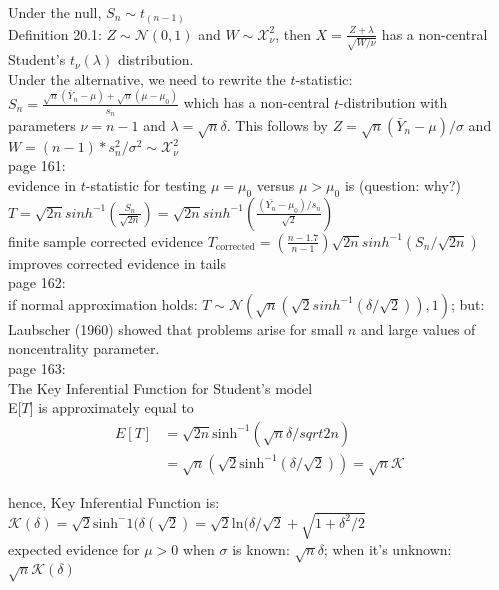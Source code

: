 Under the null, $S_n \sim t_(n-1)$\\

Definition 20.1: $Z\sim \mathcal{N}(0,1)$ and $W\sim \mathcal{X}_\nu^2$, then $X = \frac{Z+\lambda}{\sqrt{W/\nu}}$ has a non-central Student's $t_\nu(\lambda)$ distribution.\\

Under the alternative, we need to rewrite the $t$-statistic: $S_n = \frac{\sqrt{n}(\bar{Y}_n-\mu)+\sqrt{n}(\mu-\mu_0)}{s_n}$ which has a non-central $t$-distribution with parameters $\nu = n-1$ and $\lambda = \sqrt{n}\delta$. This follows by $Z = \sqrt{n}(\bar{Y}_n-\mu)/\sigma$ and $W=(n-1)*s_n^2/\sigma^2\sim \mathcal{X}_{\nu}^2$\\

page 161:\\
evidence in $t$-statistic for testing $\mu = \mu_0$ versus $\mu > \mu_0$ is (question: why?) $T = \sqrt{2n}sinh^{-1}(\frac{S_n}{\sqrt{2n}})=\sqrt{2n}sinh^{-1}(\frac{(\bar{Y_n}-\mu_0)/s_n}{\sqrt{2}})$\\
finite sample corrected evidence $T_{\text{corrected}}=(\frac{n-1.7}{n-1})\sqrt{2n}sinh^{-1}(S_n/\sqrt{2n})$ improves corrected evidence in tails\\

page 162:\\
if normal approximation holds: $T\sim \mathcal{N}(\sqrt{n}(\sqrt{2}sinh^{-1}(\delta/\sqrt{2})),1)$; but: Laubscher (1960) showed that problems arise for small $n$ and large values of noncentrality parameter.\\

page 163:\\
The Key Inferential Function for Student's model\\
E[$T$] is approximately equal to 
\begin{align*}
    E[T] &= \sqrt{2n}\text{sinh}^{-1}(\sqrt{n}\delta/sqrt{2n})\\
    &= \sqrt{n}(\sqrt{2}\text{sinh}^{-1}(\delta/\sqrt{2})) = \sqrt{n}\mathcal{K}
\end{align*}

hence, Key Inferential Function is: $\mathcal{K}(\delta)=\sqrt{2}\text{sinh}^-1(\delta(\sqrt{2})=\sqrt{2}\text{ln}(\delta/\sqrt{2}+\sqrt{1+\delta^2/2}$\\

expected evidence for $\mu > 0$ when $\sigma$ is known: $\sqrt{n}\delta$; when it's unknown: $\sqrt{n}\mathcal{K}(\delta)$\\


